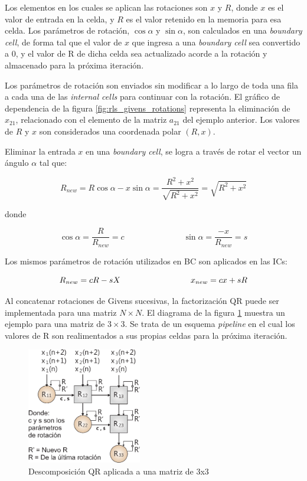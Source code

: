 Los elementos en los cuales se aplican las rotaciones son $x$ y $R$, donde $x$ es el valor de entrada en la celda, y $R$ es el valor retenido en la memoria para esa celda. Los parámetros de rotación, $\cos\alpha$ y $\sin\alpha$, son calculados en una \textit{boundary cell}, de forma tal que el valor de $x$ que ingresa a una \textit{boundary cell} sea convertido a 0, y el valor de R de dicha celda sea actualizado acorde a la rotación y almacenado para la próxima iteración.

Los parámetros de rotación son enviados sin modificar a lo largo de toda una fila a cada una de las \textit{internal cells} para continuar con la rotación. El gráfico de dependencia de la figura \ref{fig:rls_givens_rotations} representa la eliminación de $x_{21}$, relacionado con el elemento de la matriz $a_{21}$ del ejemplo anterior. Los valores de $R$ y $x$ son considerados una coordenada polar $(R, x)$.

Eliminar la entrada $x$ en una \textit{boundary cell}, se logra a través de rotar el vector un ángulo $\alpha$ tal que:

\[
R_{new} = R \cos\alpha - x \sin\alpha = \frac{R^2 + x^2}{\sqrt{R^2 + x^2}} = \sqrt{R^2 + x^2}
\]

donde

\[
\cos\alpha = \frac{R}{R_{new}} = c
\hspace{3cm}
\sin\alpha = \frac{-x}{R_{new}} = s
\]

Los mismos parámetros de rotación utilizados en BC son aplicados en las ICs:

\[
R_{new} = cR - sX \hspace{3 cm}
x_{new} = cx + sR
\]

Al concatenar rotaciones de Givens sucesivas, la factorización QR puede ser implementada para una matriz $N \times N$. El diagrama de la figura \ref{fig:givens_for_3x3} muestra un ejemplo para una matriz de $3 \times 3$. Se trata de un esquema \textit{pipeline} en el cual los valores de R son realimentados a sus propias celdas para la próxima iteración.

\begin{figure}[h!]
        \centering
        \includegraphics[width=5cm]{./figures/C03-givens_for_3x3}
        \caption{Descomposición QR aplicada a una matriz de 3x3}
        \label{fig:givens_for_3x3}
\end{figure}

